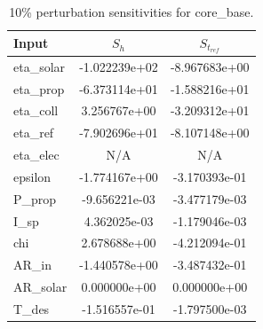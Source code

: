 \begin{table}[h]
    \centering
    \begin{tabular}{lcc}
        \toprule
        Input & $S_h$ & $S_{t_{ref}}$ \\
        \midrule
        eta\_solar & -1.022239e+02 & -8.967683e+00 \\
        eta\_prop & -6.373114e+01 & -1.588216e+01 \\
        eta\_coll & 3.256767e+00 & -3.209312e+01 \\
        eta\_ref & -7.902696e+01 & -8.107148e+00 \\
        eta\_elec & N/A & N/A \\
        epsilon & -1.774167e+00 & -3.170393e-01 \\
        P\_prop & -9.656221e-03 & -3.477179e-03 \\
        I\_sp & 4.362025e-03 & -1.179046e-03 \\
        chi & 2.678688e+00 & -4.212094e-01 \\
        AR\_in & -1.440578e+00 & -3.487432e-01 \\
        AR\_solar & 0.000000e+00 & 0.000000e+00 \\
        T\_des & -1.516557e-01 & -1.797500e-03 \\
        \bottomrule
    \end{tabular}
    \caption{10\% perturbation sensitivities for core\_base.}
    \label{tab:sensitivity_core_base}
\end{table}
